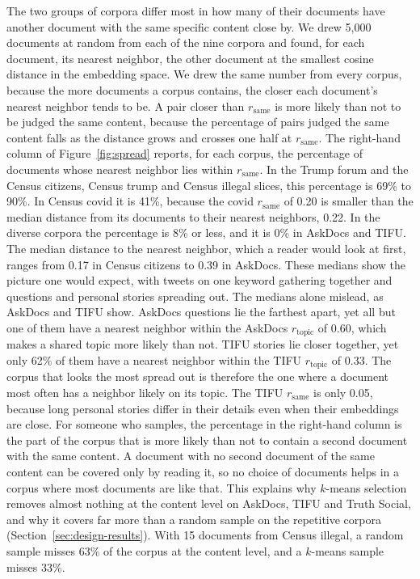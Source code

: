 The two groups of corpora differ most in how many of their documents have another document with the same specific content close by. We drew 5{,}000 documents at random from each of the nine corpora and found, for each document, its nearest neighbor, the other document at the smallest cosine distance in the embedding space. We drew the same number from every corpus, because the more documents a corpus contains, the closer each document's nearest neighbor tends to be. A pair closer than $r_{\mathrm{same}}$ is more likely than not to be judged the same content, because the percentage of pairs judged the same content falls as the distance grows and crosses one half at $r_{\mathrm{same}}$. The right-hand column of Figure~\ref{fig:spread} reports, for each corpus, the percentage of documents whose nearest neighbor lies within $r_{\mathrm{same}}$. In the Trump forum and the Census citizens, Census trump and Census illegal slices, this percentage is 69\% to 90\%. In Census covid it is 41\%, because the covid $r_{\mathrm{same}}$ of 0.20 is smaller than the median distance from its documents to their nearest neighbors, 0.22. In the diverse corpora the percentage is 8\% or less, and it is 0\% in AskDocs and TIFU. The median distance to the nearest neighbor, which a reader would look at first, ranges from 0.17 in Census citizens to 0.39 in AskDocs. These medians show the picture one would expect, with tweets on one keyword gathering together and questions and personal stories spreading out. The medians alone mislead, as AskDocs and TIFU show. AskDocs questions lie the farthest apart, yet all but one of them have a nearest neighbor within the AskDocs $r_{\mathrm{topic}}$ of 0.60, which makes a shared topic more likely than not. TIFU stories lie closer together, yet only 62\% of them have a nearest neighbor within the TIFU $r_{\mathrm{topic}}$ of 0.33. The corpus that looks the most spread out is therefore the one where a document most often has a neighbor likely on its topic. The TIFU $r_{\mathrm{same}}$ is only 0.05, because long personal stories differ in their details even when their embeddings are close. For someone who samples, the percentage in the right-hand column is the part of the corpus that is more likely than not to contain a second document with the same content. A document with no second document of the same content can be covered only by reading it, so no choice of documents helps in a corpus where most documents are like that. This explains why $k$-means selection removes almost nothing at the content level on AskDocs, TIFU and Truth Social, and why it covers far more than a random sample on the repetitive corpora (Section~\ref{sec:design-results}). With 15 documents from Census illegal, a random sample misses 63\% of the corpus at the content level, and a $k$-means sample misses 33\%.

